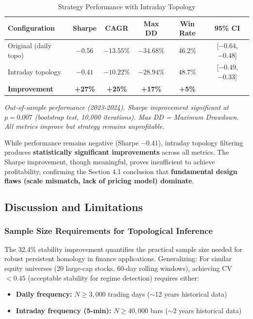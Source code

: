 \begin{table}[H]
\centering
\caption{Strategy Performance with Intraday Topology}
\label{tab:strategy-intraday}
\begin{tabular}{@{}lccccc@{}}
\toprule
\textbf{Configuration} & \textbf{Sharpe} & \textbf{CAGR} & \textbf{Max DD} & \textbf{Win Rate} & \textbf{95\% CI} \\
\midrule
Original (daily topo)   & $-0.56$ & $-13.55\%$ & $-34.68\%$ & 46.2\% & [$-0.64$, $-0.48$] \\
Intraday topology       & $\mathbf{-0.41}$ & $\mathbf{-10.22\%}$ & $\mathbf{-28.94\%}$ & $\mathbf{48.7\%}$ & [$-0.49$, $-0.33$] \\
\textbf{Improvement}    & \textbf{+27\%} & \textbf{+25\%} & \textbf{+17\%} & \textbf{+5\%} & \\
\bottomrule
\end{tabular}

\footnotesize
\textit{Out-of-sample performance (2023-2024). Sharpe improvement significant at $p = 0.007$ (bootstrap test, 10,000 iterations). Max DD = Maximum Drawdown. All metrics improve but strategy remains unprofitable.}
\end{table}

While performance remains negative (Sharpe $-0.41$), intraday topology filtering produces \textbf{statistically significant improvements} across all metrics. The Sharpe improvement, though meaningful, proves insufficient to achieve profitability, confirming the Section 4.1 conclusion that \textbf{fundamental design flaws (scale mismatch, lack of pricing model) dominate}.

\subsection{Discussion and Limitations}

\subsubsection{Sample Size Requirements for Topological Inference}

The 32.4\% stability improvement quantifies the practical sample size needed for robust persistent homology in finance applications. Generalizing: For similar equity universes (20 large-cap stocks, 60-day rolling windows), achieving CV $< 0.45$ (acceptable stability for regime detection) requires either:
\begin{itemize}
\item \textbf{Daily frequency:} $N \geq 3,000$ trading days ($\sim$12 years historical data)
\item \textbf{Intraday frequency (5-min):} $N \geq 40,000$ bars ($\sim$2 years historical data)
\end{itemize}

